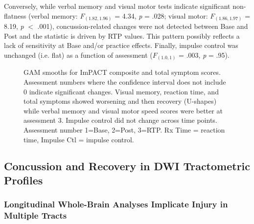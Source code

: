 \documentclass[12pt]{article}
\begin{document}
Conversely, while verbal memory and visual motor tests indicate significant non-flatness (verbal memory: $F_{(1.82, 1.96)}$ = 4.34, \textit{p} = .028; visual motor: $F_{(1.86, 1.97)}$ = 8.19, \textit{p} $<$ .001), concussion-related changes were not detected between Base and Post and the statistic is driven by RTP values. This pattern possibly reflects a lack of sensitivity at Base and/or practice effects. Finally, impulse control was unchanged (i.e. flat) as a function of assessment ($F_{(1.0, 1)}$ = .003, \textit{p} = .95).

\begin{figure}[H]
	\centering
	\caption{GAM smooths for ImPACT composite and total symptom scores. Assessment numbers where the confidence interval does not include 0 indicate significant changes. Visual memory, reaction time, and total symptoms showed worsening and then recovery (U-shapes) while verbal memory and visual motor speed scores were better at assessment 3. Impulse control did not change across time points. Assessment number 1=Base, 2=Post, 3=RTP. Rx Time = reaction time, Impulse Ctl = impulse control.}
	\label{fig:imp-gam}
\end{figure}


\subsection{Concussion and Recovery in DWI Tractometric Profiles}
\label{ssec:res-dwi-tract}

\subsubsection{Longitudinal Whole-Brain Analyses Implicate Injury in Multiple Tracts}
\label{sssec:res-dwi-tract-wba}
\end{document}

